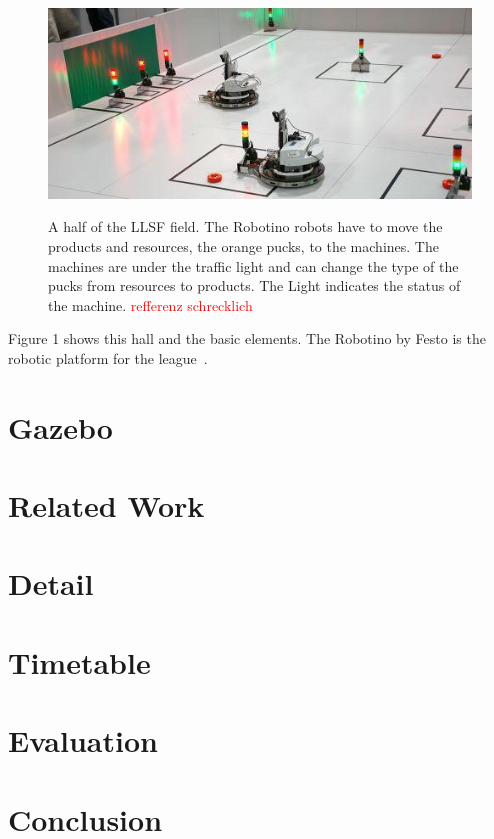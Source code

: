 \documentclass[11pt,a4paper,titlepage]{article}
\begin{document}
\begin{figure}
\includegraphics[scale=0.7]{pics/llsf1}
\label{Figure 1}
\caption{A half of the LLSF field. The Robotino robots have to move the products and resources, the orange pucks, to the machines. The machines are under the traffic light and can change the type of the pucks from resources to products. The Light indicates the status of the machine. \textcolor{red}{refferenz schrecklich~\cite{LLSFGermanOpen}}}
\end{figure}
Figure 1 shows this hall and the basic elements. The Robotino by Festo is the robotic platform for the league~\cite{Robotino}.

\section{Gazebo}
\section{Related Work}
\section{Detail}
\section{Timetable}
\section{Evaluation}
\section{Conclusion}



\end{document}
